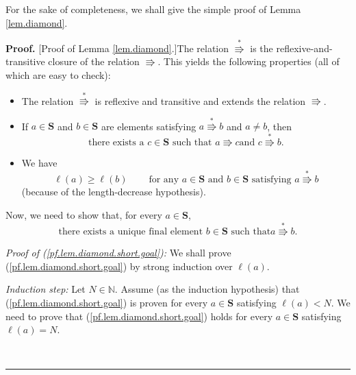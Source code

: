 \documentclass[numbers=enddot,12pt,final,onecolumn,notitlepage]{scrartcl}%
\theoremstyle{definition}
\newenvironment{proof}[1][Proof]{\noindent\textbf{#1.} }{\ \rule{0.5em}{0.5em}}
\newenvironment{vershort}{}{}
\begin{document}
For the sake of completeness, we shall give the simple proof of Lemma
\ref{lem.diamond}.

\begin{vershort}
\begin{proof}
[Proof of Lemma \ref{lem.diamond}.]The relation $\overset{\ast}{\Rrightarrow}$
is the reflexive-and-transitive closure of the relation $\Rrightarrow$. This
yields the following properties (all of which are easy to check):

\begin{itemize}
\item The relation $\overset{\ast}{\Rrightarrow}$ is reflexive and transitive
and extends the relation $\Rrightarrow$.

\item If $a\in\mathbf{S}$ and $b\in\mathbf{S}$ are elements satisfying
$a\overset{\ast}{\Rrightarrow}b$ and $a\neq b$, then%
\begin{equation}
\text{there exists a }c\in\mathbf{S}\text{ such that }a\Rrightarrow c\text{
and }c\overset{\ast}{\Rrightarrow}b. \label{pf.lem.diamond.short.lem1}%
\end{equation}


\item We have%
\begin{equation}
\ell\left(  a\right)  \geq\ell\left(  b\right)  \ \ \ \ \ \ \ \ \ \ \text{for
any }a\in\mathbf{S}\text{ and }b\in\mathbf{S}\text{ satisfying }%
a\overset{\ast}{\Rrightarrow}b \label{pf.lem.diamond.short.lem2}%
\end{equation}
(because of the length-decrease hypothesis).
\end{itemize}

Now, we need to show that, for every $a\in\mathbf{S}$,
\begin{equation}
\text{there exists a unique final element }b\in\mathbf{S}\text{ such that
}a\overset{\ast}{\Rrightarrow}b\text{.} \label{pf.lem.diamond.short.goal}%
\end{equation}


\textit{Proof of (\ref{pf.lem.diamond.short.goal}):} We shall prove
(\ref{pf.lem.diamond.short.goal}) by strong induction over $\ell\left(
a\right)  $.

\textit{Induction step:} Let $N\in\mathbb{N}$. Assume (as the induction
hypothesis) that (\ref{pf.lem.diamond.short.goal}) is proven for every
$a\in\mathbf{S}$ satisfying $\ell\left(  a\right)  <N$. We need to prove that
(\ref{pf.lem.diamond.short.goal}) holds for every $a\in\mathbf{S}$ satisfying
$\ell\left(  a\right)  =N$.


\end{proof}
\end{vershort}
\end{document}
